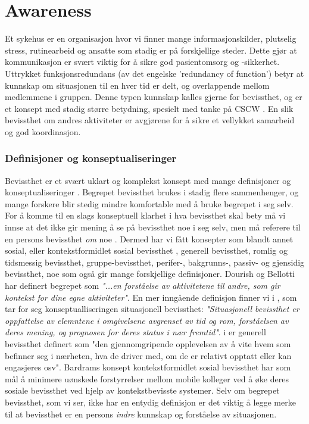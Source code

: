 \section{Awareness}
\label{chp: awareness}

Et sykehus er en organisasjon hvor vi finner mange informasjonskilder, plutselig stress, rutinearbeid og ansatte som stadig er på forskjellige steder. Dette gjør at kommunikasjon er svært viktig for å sikre god pasientomsorg og -sikkerhet\cite{Klemets12}. Uttrykket funksjonsredundans (av det engelske 'redundancy of function') betyr at kunnskap om situasjonen til en hver tid er delt, og overlappende mellom medlemmene i gruppen.\cite{KlemetsRedundancy} Denne typen kunnskap kalles gjerne for bevissthet, og er et konsept med stadig større betydning, spesielt med tanke på CSCW \cite{Dourish92}. En slik bevissthet om andres aktiviteter er avgjørene for å sikre et vellykket samarbeid og god koordinasjon\cite{KlemetsRedundancy}. 

\subsubsection{Definisjoner og konseptualiseringer}
Bevissthet er et svært uklart og komplekst konsept med mange definisjoner og konseptualiseringer \cite{KlemetsRedundancy}\cite{Gutwin04}\cite{Schmidt02}. Begrepet bevissthet brukes i stadig flere sammenhenger, og mange forskere blir stedig mindre komfortable med å bruke begrepet i seg selv. For å komme til en slags konseptuell klarhet i hva bevissthet skal bety må vi innse at det ikke gir mening å se på bevissthet noe i seg selv, men må referere til en persons bevissthet \emph{om} noe \cite{Schmidt02}. Dermed har vi fått konsepter som blandt annet sosial, eller kontekstformidlet sosial bevissthet \cite{Bardram04}, generell bevissthet\cite{Gross13}, romlig og tidsmessig bevissthet\cite{Randell10}, gruppe-bevissthet\cite{Gutwin04}, perifer-, bakgrunns-, passiv- og gjensidig bevissthet\cite{Schmidt02}, noe som også gir mange forskjellige definisjoner. Dourish og Bellotti har definert begrepet som \emph{"...en forståelse av aktivitetene til andre, som gir kontekst for dine egne aktiviteter"}. En mer inngående definisjon finner vi i \cite{Endsly95}, som tar for seg konseptualliseringen situasjonell bevissthet: \emph{"Situasjonell bevissthet er oppfattelse av elemntene i omgivelsene avgrenset av tid og rom, forståelsen av deres mening, og prognosen for deres status i nær fremtid"}. i \cite{Gross13} er generell bevissthet definert som "den gjennomgripende opplevelsen av å vite hvem som befinner seg i nærheten, hva de driver med, om de er relativt opptatt eller kan engasjeres osv". Bardrams konsept kontekstformidlet sosial bevissthet har som mål å minimere uønskede forstyrrelser mellom mobile kolleger ved å øke deres sosiale bevissthet ved hjelp av kontekstbevisste systemer\cite{Bardram04}. Selv om begrepet bevissthet, som vi ser, ikke har en entydig definisjon er det viktig å legge merke til at bevissthet er en persons \emph{indre} kunnskap og forståelse av situasjonen\cite{Gross13}. 

